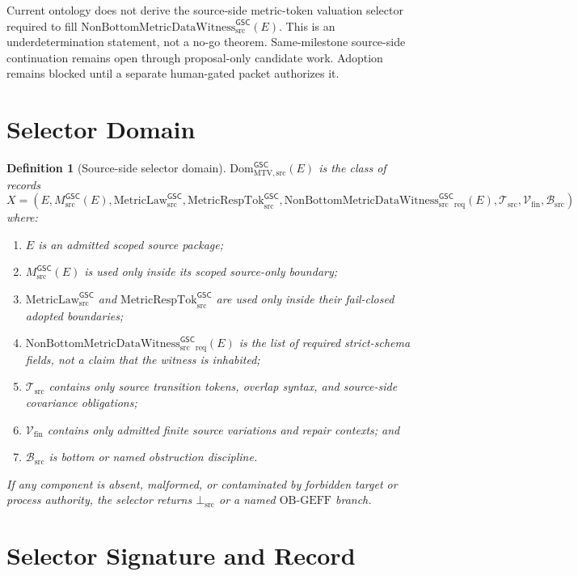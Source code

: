 \documentclass[11pt]{article}
\newcommand{\MsrcGSC}{M_{\mathrm{src}}^{\mathsf{GSC}}}
\newcommand{\MetricLaw}{\mathrm{MetricLaw}_{\mathrm{src}}^{\mathsf{GSC}}}
\newcommand{\MetricRespTok}{\mathrm{MetricRespTok}_{\mathrm{src}}^{\mathsf{GSC}}}
\newcommand{\DomMTV}{\mathrm{Dom}_{\mathrm{MTV,src}}^{\mathsf{GSC}}}
\newcommand{\Witness}{\mathrm{NonBottomMetricDataWitness}_{\mathrm{src}}^{\mathsf{GSC}}}
\newcommand{\BottomSrc}{\bot_{\mathrm{src}}}
\newtheorem{definition}{Definition}
\begin{document}
Current ontology does not derive the source-side metric-token valuation
selector required to fill \(\Witness(E)\). This is an underdetermination
statement, not a no-go theorem. Same-milestone source-side continuation
remains open through proposal-only candidate work. Adoption remains blocked
until a separate human-gated packet authorizes it.

\section{Selector Domain}

\begin{definition}[Source-side selector domain]
\(\DomMTV(E)\) is the class of records
\[
  X =
  (E,\MsrcGSC(E),\MetricLaw,\MetricRespTok,\Witness_{\mathrm{req}}(E),
  \mathcal{T}_{\mathrm{src}},\mathcal{V}_{\mathrm{fin}},\mathcal{B}_{\mathrm{src}})
\]
where:
\begin{enumerate}[leftmargin=*]
  \item \(E\) is an admitted scoped source package;
  \item \(\MsrcGSC(E)\) is used only inside its scoped source-only boundary;
  \item \(\MetricLaw\) and \(\MetricRespTok\) are used only inside their
  fail-closed adopted boundaries;
  \item \(\Witness_{\mathrm{req}}(E)\) is the list of required strict-schema
  fields, not a claim that the witness is inhabited;
  \item \(\mathcal{T}_{\mathrm{src}}\) contains only source transition tokens,
  overlap syntax, and source-side covariance obligations;
  \item \(\mathcal{V}_{\mathrm{fin}}\) contains only admitted finite source
  variations and repair contexts; and
  \item \(\mathcal{B}_{\mathrm{src}}\) is bottom or named obstruction
  discipline.
\end{enumerate}
If any component is absent, malformed, or contaminated by forbidden target or
process authority, the selector returns \(\BottomSrc\) or a named
\(\mathrm{OB\mbox{-}GEFF}\) branch.
\end{definition}

\section{Selector Signature and Record}
\end{document}
